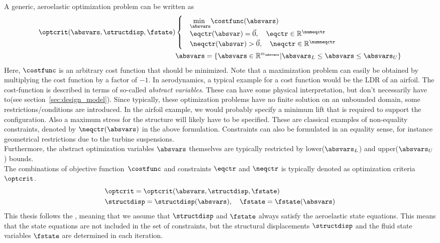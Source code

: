\documentclass[../main.tex]{subfiles}
\begin{document}
A generic, aeroelastic optimization problem can be written as
\begin{align}
\optcrit(\absvars,\structdisp,\fstate)
&\begin{cases}
&\underset{\absvars}{\text{min }}\costfunc(\absvars) \\%
&\eqctr(\absvar)=\vec{0},~~~\eqctr \in \mathbb{R}^{\numeqctr} \\
&\neqctr(\absvar)>\vec{0},~~~\neqctr \in \mathbb{R}^{\numneqctr} \\
\end{cases} \label{eq:generic_optimization_problem_1}\\
&\absvars = \{ \absvars \in \mathbb{R}^{n_{\absvars}} | \absvars_L \leq \absvars \leq \absvars_U \}\label{eq:generic_optimization_problem_2}
\end{align}
Here,  $\costfunc$ is an arbitrary cost function that should be minimized. Note that a maximization problem can easily be obtained by multiplying the cost function by a factor of $-1$. In aerodynamics, a typical example for a cost function would be the \ac{LDR} of an airfoil. The cost-function is described in terms of so-called \textit{abstract variables}. These can have some physical interpretation, but don't necessarily have to(see section~\ref{sec:design_model}). Since typically, these optimization problems have no finite solution on an unbounded domain, some restrictions/conditions are introduced. In the airfoil example, we would probably specify a minimum lift that is required to support the configuration. Also a maximum stress for the structure will likely have to be specified. These are classical examples of non-equality constraints, denoted by $\neqctr(\absvars)$ in the above formulation. Constraints can also be formulated in an equality sense, for instance geometrical restrictions due to the turbine suspensions.\\
Furthermore, the abstract optimization variables $\absvars$ themselves are typically restricted by lower($\absvars_L$) and upper($\absvars_U$) bounds.\\
The combinations of objective function~$\costfunc$ and constraints $\eqctr$ and $\neqctr$ is typically denoted as optimization criteria $\optcrit$.
\begin{align}\label{eq:optimization_criteria}
&\optcrit=\optcrit(\absvars,\structdisp,\fstate) \nonumber \\
&\structdisp=\structdisp(\absvars),~~~\fstate=\fstate(\absvars)
\end{align}
This thesis follows the , meaning that we assume that $\structdisp$ and $\fstate$ always satisfy the aeroelastic state equations. This means that the state equations are not included in the set of constraints, but the structural displacements $\structdisp$ and the fluid state variables $\fstate$ are determined in each iteration.
\end{document}
